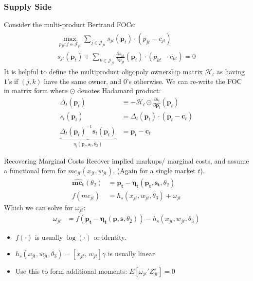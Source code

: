 \documentclass[xcolor=pdftex,dvipsnames,table,mathserif,aspectratio=169]{beamer}
\begin{document}
\begin{frame}[plain]
\frametitle{Supply Side}
\footnotesize
Consider the multi-product Bertrand FOCs:
\begin{align*}
\begin{array}{c}
\max _{p_{j t}: j \in \mathcal{J}_{f t}} \sum_{j \in \mathcal{J}_{f t}} s_{j t}\left(\boldsymbol{p}_{t}\right) \cdot\left(p_{j t}-c_{j t}\right) \\
s_{j t}\left(\boldsymbol{p}_{t}\right)+\sum_{k \in \mathcal{J}_{f t}} \frac{\partial s_{k t}}{\partial p_{j t}}\left(\boldsymbol{p}_{t}\right) \cdot\left(p_{k t}-c_{k t}\right)=0
\end{array}
\end{align*}
It is helpful to define the \alert{multiproduct oligopoly ownership matrix} $\mathcal{H}_t$ as having $1$'s if $(j,k)$ have the same owner, and $0$'s otherwise. We can re-write the FOC in matrix form where $\odot$ denotes Hadamard product:
\begin{align*}
\Delta_{t}\left(\boldsymbol{p}_{t}\right) &\equiv-\mathcal{H}_{t} \odot \frac{\partial \boldsymbol{s}_{t}}{\partial \boldsymbol{p}_{t}}\left(\boldsymbol{p}_{t}\right)\\
s_{t}\left(\boldsymbol{p}_{t}\right) &=\Delta_{t}\left(\boldsymbol{p}_{t}\right) \cdot\left(\boldsymbol{p}_{t}-\boldsymbol{c}_{t}\right) \\
\underbrace{\Delta_{t}\left(\boldsymbol{p}_{t}\right)^{-1} \boldsymbol{s}_{t}\left(\boldsymbol{p}_{t}\right)}_{\eta_{t}\left(\boldsymbol{p}_{t}, \boldsymbol{s}_{t}, \theta_{2}\right)} &=\boldsymbol{p}_{t}-\boldsymbol{c}_{t}
\end{align*}
\end{frame}



\begin{frame}{Recovering Marginal Costs }
Recover implied markups/ marginal costs, and assume a functional form for $mc_{jt}(x_{jt},w_{jt})$. (Again for a single market $t$).
\begin{align*}
\widehat{\mathbf{mc_t}}(\theta_2)&= \mathbf{p_t}- \boldsymbol{\eta_t}(\mathbf{p_t},\mathbf{s_t},\theta_2)\\
f(mc_{jt}) &= h_s(x_{jt} , w_{jt},\theta_3)+ \omega_{jt}
\end{align*}
Which we can solve for $\omega_{jt}$:
\begin{align*}
\omega_{jt} &=  f(\mathbf{p_t}- \boldsymbol{\eta_t}(\mathbf{p},\mathbf{s},\theta_2)) - h_s(x_{jt},w_{jt},\theta_3)
\end{align*}
\vspace{-0.4cm}
\begin{itemize}
\item $f(\cdot)$ is usually $\log(\cdot)$ or identity.
\item $h_s(x_{jt},w_{jt},\theta_3) = [x_{jt}, \, w_{jt}] \gamma$ is usually linear
\item Use this to form additional moments: $E[\omega_{jt}' Z_{jt}^{s}]=0$
\end{itemize}
\end{frame}
\end{document}
